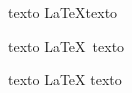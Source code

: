 \documentclass{article}
\begin{document}
	texto \LaTeX   texto
	 
	texto \LaTeX\  texto 
	
	texto \LaTeX{} texto 	   %
					
\end{document}
